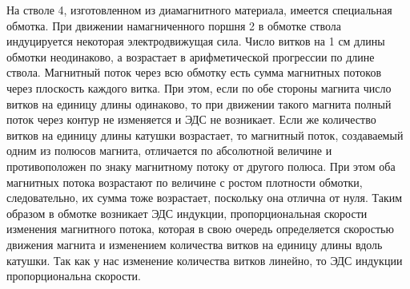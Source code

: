 \documentclass[specialist, subf, href, colorlinks=true, 14pt, final]{disser}
\theoremstyle{definition}
\begin{document}
На стволе 4, изготовленном из диамагнитного материала, имеется специальная обмотка. При движении намагниченного поршня 2 в обмотке ствола индуцируется некоторая электродвижущая сила. Число витков на 1 см длины обмотки неодинаково, а возрастает в арифметической прогрессии по длине ствола. Магнитный поток через всю обмотку есть сумма магнитных потоков через плоскость каждого витка. При этом, если по обе стороны магнита число витков на единицу длины одинаково, то при движении такого магнита полный поток через контур не изменяется и ЭДС не возникает. Если же количество витков на единицу длины катушки возрастает, то магнитный поток, создаваемый одним из полюсов магнита, отличается по абсолютной величине и противоположен по знаку магнитному потоку от другого полюса. При этом оба магнитных потока возрастают по величине с ростом плотности обмотки, следовательно, их сумма тоже возрастает, поскольку она отлична от нуля. Таким образом в обмотке возникает ЭДС индукции, пропорциональная скорости изменения магнитного потока, которая в свою очередь определяется скоростью движения магнита и изменением количества витков на единицу длины вдоль катушки. Так как у нас изменение количества витков линейно, то ЭДС индукции пропорциональна скорости.
\end{document}
